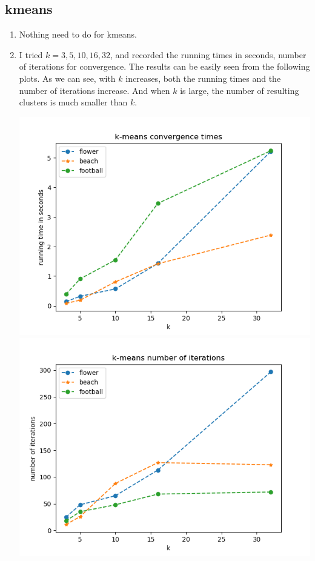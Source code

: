 \documentclass[twoside,10pt]{article}
\begin{document}
\subsection{kmeans}
\begin{enumerate}
    \item Nothing need to do for kmeans.
    \item I tried $k = 3,5,10,16,32$, and recorded the running times in seconds, number of iterations for convergence. The results can be easily seen from the following plots. As we can see, with $k$ increases, both the running times and the number of iterations increase. And when $k$ is large, the number of resulting clusters is much smaller than $k$. 

    \begin{center}\includegraphics[scale=0.5]{images/kmeans_times.png}\includegraphics[scale=0.5]{images/kmeans_iters.png}\end{center}

\end{enumerate}
\end{document}
